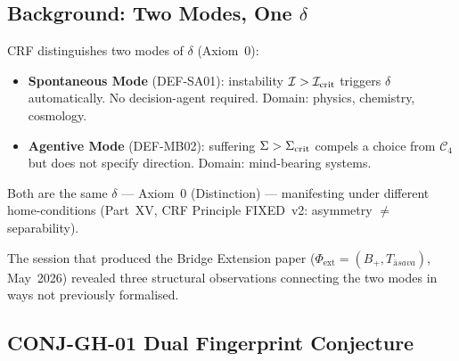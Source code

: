 \documentclass[12pt, a4paper]{article}
\providecommand{\Phiext}{\Phi_{\mathrm{ext}}}
\providecommand{\Bplus}{B_{+}}
\providecommand{\Tasava}{T_{\bar{\mathrm{a}}sava}}
\providecommand{\Tasava}{\mathcal{T}_{\!\mathrm{\bar{a}sava}}}
\begin{document}
\begin{abstract}
Three structural observations emerge from comparing the
results of the Bridge Extension paper ($\Phiext$,
$\Tasava$, $w_{\rm cycle}$) with the Z-Programme
(ZC41: THM-GAMMA-01) and the Axiom~11 Upgrade (State~10
conditions). Together they suggest that the Spontaneous
and Agentive modes of $\delta$ are not merely parallel
descriptions but \emph{dual projections of the same
conserved structure}.

The three conjectures are registered here for future
derivation. None is promoted beyond its current status;
all are held at Failure Stance discipline.
\end{abstract}

\tableofcontents
\newpage

\subsection{Background: Two Modes, One \texorpdfstring{$\delta$}{math}}


CRF distinguishes two modes of $\delta$ (Axiom~0):

\begin{itemize}[leftmargin=*, itemsep=2pt]
\item \textbf{Spontaneous Mode} (DEF-SA01): instability
  $\mathcal{I} > \mathcal{I}_{\rm crit}$ triggers
  $\delta$ automatically. No decision-agent required.
  Domain: physics, chemistry, cosmology.

\item \textbf{Agentive Mode} (DEF-MB02): suffering
  $\Sigma > \Sigma_{\rm crit}$ compels a choice from
  $\mathcal{C}_4$ but does not specify direction.
  Domain: mind-bearing systems.
\end{itemize}

Both are the same $\delta$ — Axiom~0 (Distinction) —
manifesting under different home-conditions (Part~XV,
CRF Principle FIXED~v2: asymmetry $\neq$ separability).

The session that produced the Bridge Extension paper
($\Phiext = (\Bplus, \Tasava)$, May~2026) revealed three
structural observations connecting the two modes in
ways not previously formalised.

\subsection{CONJ-GH-01 \quad Dual Fingerprint Conjecture}
\end{document}
